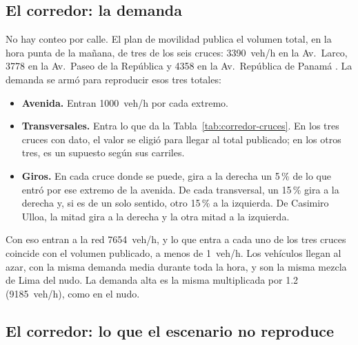 \subsection*{El corredor: la demanda}

No hay conteo por calle. El plan de movilidad publica el volumen total,
en la hora punta de la mañana, de tres de los seis cruces: 3390~veh/h en
la Av.~Larco, 3778 en la Av.~Paseo de la República y 4358 en la
Av.~República de Panamá \citep{Miraflores2017_PMU}. La demanda se armó
para reproducir esos tres totales:
\begin{itemize}
  \item \textbf{Avenida.} Entran 1000~veh/h por cada extremo.
  \item \textbf{Transversales.} Entra lo que da la
    Tabla~\ref{tab:corredor-cruces}. En los tres cruces con dato, el
    valor se eligió para llegar al total publicado; en los otros tres,
    es un supuesto según sus carriles.
  \item \textbf{Giros.} En cada cruce donde se puede, gira a la derecha
    un 5\,\% de lo que entró por ese extremo de la avenida. De cada
    transversal, un 15\,\% gira a la derecha y, si es de un solo
    sentido, otro 15\,\% a la izquierda. De Casimiro Ulloa, la mitad
    gira a la derecha y la otra mitad a la izquierda.
\end{itemize}
Con eso entran a la red 7654~veh/h, y lo que entra a cada uno de los
tres cruces coincide con el volumen publicado, a menos de 1~veh/h. Los
vehículos llegan al azar, con la misma demanda media durante toda la
hora, y son la misma mezcla de Lima del nudo. La demanda alta es la
misma multiplicada por 1.2 (9185~veh/h), como en el nudo.

\subsection*{El corredor: lo que el escenario no reproduce}

